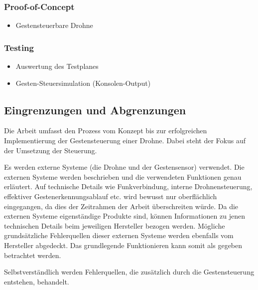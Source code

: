 \subsubsection{Proof-of-Concept}
\begin{itemize}
	\item Gestensteuerbare Drohne
\end{itemize}

\subsubsection{Testing}
\begin{itemize}
	\item Auswertung des Testplanes
	\item Gesten-Steuersimulation (Konsolen-Output)
\end{itemize}


\subsection{Eingrenzungen und Abgrenzungen}
Die Arbeit umfasst den Prozess vom Konzept bis zur erfolgreichen Implementierung der Gestensteuerung einer Drohne.
Dabei steht der Fokus auf der Umsetzung der Steuerung.

Es werden externe Systeme (die Drohne und der Gestensensor) verwendet.
Die externen Systeme werden beschrieben und die verwendeten Funktionen genau erläutert.
Auf technische Details wie Funkverbindung, interne Drohnensteuerung, effektiver Gestenerkennungsablauf etc. wird bewusst nur oberflächlich eingegangen, da dies der Zeitrahmen der Arbeit überschreiten würde.
Da die externen Systeme eigenständige Produkte sind, können Informationen zu jenen technischen Details beim jeweiligen Hersteller bezogen werden.
Mögliche grundsätzliche Fehlerquellen dieser externen Systeme werden ebenfalls vom Hersteller abgedeckt.
Das grundlegende Funktionieren kann somit als gegeben betrachtet werden.

Selbstverständlich werden Fehlerquellen, die zusätzlich durch die Gestensteuerung entstehen, behandelt.
